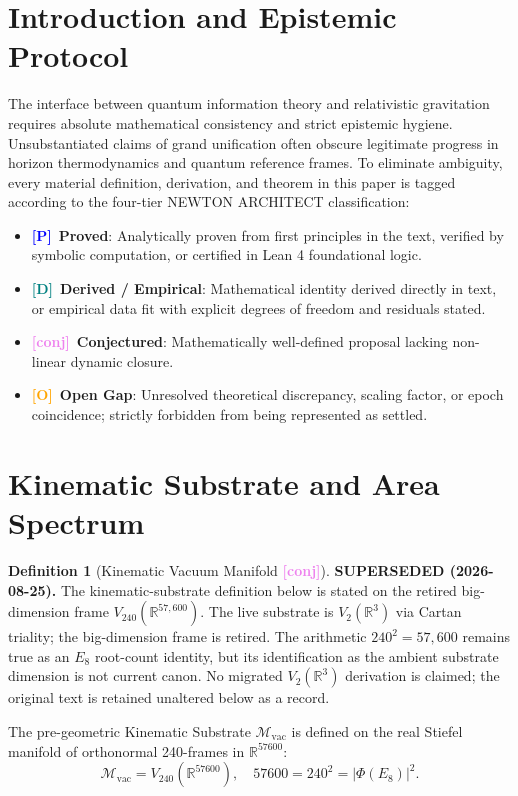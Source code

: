 \documentclass[aps,prd,twocolumn,superscriptaddress,nofootinbib,floatfix]{revtex4-2}
\newcommand{\tagP}{\textcolor{blue}{\textbf{[P]}}}
\newcommand{\tagD}{\textcolor{teal}{\textbf{[D]}}}
\newcommand{\tagC}{\textcolor{violet}{\textbf{[conj]}}}
\newcommand{\tagO}{\textcolor{orange}{\textbf{[O]}}}
\theoremstyle{plain}
\theoremstyle{definition}
\newtheorem{definition}[theorem]{Definition}
\begin{document}
\section{Introduction and Epistemic Protocol}
\label{sec:intro}

The interface between quantum information theory and relativistic gravitation requires absolute mathematical consistency and strict epistemic hygiene. Unsubstantiated claims of grand unification often obscure legitimate progress in horizon thermodynamics and quantum reference frames. To eliminate ambiguity, every material definition, derivation, and theorem in this paper is tagged according to the four-tier NEWTON ARCHITECT classification:
\begin{itemize}
\item \tagP\ \textbf{Proved}: Analytically proven from first principles in the text, verified by symbolic computation, or certified in Lean 4 foundational logic.
\item \tagD\ \textbf{Derived / Empirical}: Mathematical identity derived directly in text, or empirical data fit with explicit degrees of freedom and residuals stated.
\item \tagC\ \textbf{Conjectured}: Mathematically well-defined proposal lacking non-linear dynamic closure.
\item \tagO\ \textbf{Open Gap}: Unresolved theoretical discrepancy, scaling factor, or epoch coincidence; strictly forbidden from being represented as settled.
\end{itemize}

\section{Kinematic Substrate and Area Spectrum}
\label{sec:substrate}

\begin{definition}[Kinematic Vacuum Manifold \tagC]

\vspace{2mm}\noindent\textbf{\color{gold}SUPERSEDED (2026-08-25).} The kinematic-substrate definition below is stated on the retired big-dimension frame $V_{240}(\mathbb{R}^{57{,}600})$. The live substrate is $V_2(\mathbb{R}^3)$ via Cartan triality; the big-dimension frame is retired. The arithmetic $240^2=57{,}600$ remains true as an $E_8$ root-count identity, but its identification as the ambient substrate dimension is not current canon. No migrated $V_2(\mathbb{R}^3)$ derivation is claimed; the original text is retained unaltered below as a record.\vspace{2mm}

The pre-geometric Kinematic Substrate $\mathcal{M}_{\mathrm{vac}}$ is defined on the real Stiefel manifold of orthonormal 240-frames in $\mathbb{R}^{57600}$:
\begin{equation}
\mathcal{M}_{\mathrm{vac}} = V_{240}(\mathbb{R}^{57600}), \quad 57600 = 240^2 = |\Phi(E_8)|^2.
\end{equation}
\end{definition}
\end{document}
